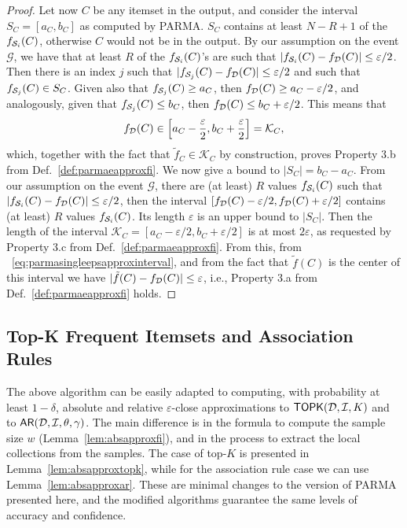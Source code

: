 \begin{proof}
  Let now $C$ be any itemset in the output, and consider the interval
  $S_C=[a_C,b_C]$ as computed by PARMA. $S_C$ contains at least $N-R+1$ of
  the $f_{{\cal S}_i}(C)$, otherwise $C$ would not be in the output. By our
  assumption on the event $\mathcal{G}$, we have
  that at least $R$ of the $f_{{\cal S}_i}(C)$'s are such that
  $|f_{{\cal S}_i}(C)-f_{\cal D}(C)|\le\varepsilon/2$. Then there is an index $j$ such
  that $|f_{{\cal S}_j}(C)-f_{\cal D}(C)|\le\varepsilon/2$ and such that
  $f_{{\cal S}_j}(C)\in S_C$.
  Given also that $f_{{\cal S}_j}(C)\ge a_C$, then $f_{\cal D}(C)\ge
  a_C-\varepsilon/2$, and analogously, given that $f_{{\cal S}_j}(C)\le b_C$, then
  $f_{\cal D}(C)\le b_C+\varepsilon/2$. This means that
  \begin{equation}\label{eq:parmasingleepsapproxinterval}
    f_{\cal D}(C)\in
    \left[a_C-\frac{\varepsilon}{2},
    b_C+\frac{\varepsilon}{2}\right]=\mathcal{K}_C,
  \end{equation}
  which, together with the fact that $\tilde{f}_C\in\mathcal{K}_C$ by
  construction, proves Property 3.b from Def.~\ref{def:parmaeapproxfi}.
  We now give a bound to $|S_C|=b_C-a_C$. From our
  assumption on the event $\mathcal{G}$, there are (at least) $R$ values
  $f_{{\cal S}_i}(C)$ such that $|f_{{\cal S}_i}(C)-f_{\cal D}(C)|\le\varepsilon/2$, then the
  interval $[f_{\cal D}(C)-\varepsilon/2,f_{\cal D}(C)+\varepsilon/2]$ contains (at least)
  $R$ values $f_{{\cal S}_i}(C)$. Its length $\varepsilon$ is an upper bound to
  $|S_C|$. Then the length of the interval
  $\mathcal{K}_C=[a_C-\varepsilon/2,b_C+\varepsilon/2]$ is at most
  $2\varepsilon$, as requested by Property 3.c from
  Def.~\ref{def:parmaeapproxfi}. From this, from ~\eqref{eq:parmasingleepsapproxinterval}, and
  from the fact that $\tilde{f}(C)$ is the center of this interval we have
  $|\tilde{f}(C)-f_{\cal D}(C)|\le\varepsilon$, i.e., Property 3.a from
  Def.~\ref{def:parmaeapproxfi} holds.
\end{proof}

\subsection{Top-K Frequent Itemsets and Association Rules}\label{sec:parmaeapproxtopk}
The above algorithm can be easily adapted to computing, with probability at
least $1-\delta$, absolute and relative $\varepsilon$-close approximations to $\mathsf{TOPK}({\cal D},{\cal I},K)$ and to
$\mathsf{AR}({\cal D},{\cal I},\theta,\gamma)$. The main difference is in the formula to compute
the sample size $w$ (Lemma~\ref{lem:absapproxfi}), and in the process
to extract the local collections from the samples. The case of top-$K$ is
presented in Lemma~\ref{lem:absapproxtopk}, while for the association rule case
we can use Lemma~\ref{lem:absapproxar}. These are minimal changes to the version
of PARMA presented here, and the modified algorithms guarantee the same levels
of accuracy and confidence.

